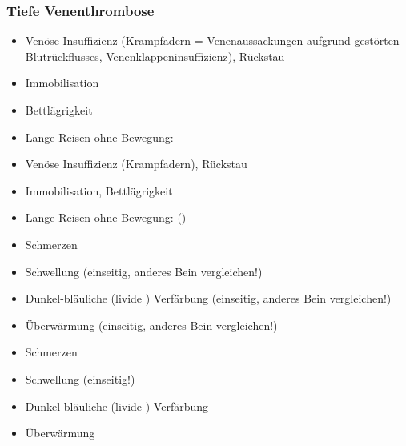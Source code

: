 
\subsubsection{Tiefe Venenthrombose}



{
\begin{itemize}
  \item Venöse Insuffizienz (Krampfadern = Venenaussackungen aufgrund
  gestörten  Blutrückflusses, Venenklappeninsuffizienz), Rückstau
  \item Immobilisation
  \item Bettlägrigkeit
  \item Lange Reisen ohne Bewegung: 
\end{itemize}
}{
\begin{itemize}
  \item Venöse Insuffizienz (Krampfadern), Rückstau
  \item Immobilisation, Bettlägrigkeit
  \item Lange Reisen ohne Bewegung: ()
\end{itemize}
}{}{}{}

{
\begin{itemize}
  \item Schmerzen
  \item Schwellung (einseitig, anderes Bein vergleichen!)
  \item Dunkel-bläuliche (livide ) Verfärbung (einseitig, anderes Bein
  vergleichen!)
  \item Überwärmung (einseitig, anderes Bein vergleichen!)
\end{itemize}
}{
\begin{itemize}
  \item Schmerzen
  \item Schwellung (einseitig!)
  \item Dunkel-bläuliche (livide ) Verfärbung
  \item Überwärmung
\end{itemize}
}{}{}{}

